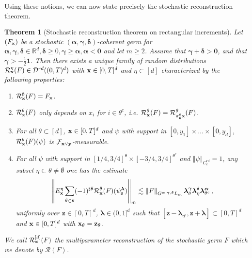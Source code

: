 \documentclass[12pt]{article}
\numberwithin{equation}{section}
\theoremstyle{plain}
\newtheorem{theorem}{Theorem}[section]
\theoremstyle{definition}
\newcommand{\norm}[1]{\left\Vert #1\right\Vert}
\def\bR{\mathbb{R}}\def\bS{\mathbb{S}}
\def\fy{\mathbf y}\def\fz{\mathbf z}
\def\falpha{{\boldsymbol\alpha}}
\def\fgamma{{\boldsymbol\gamma}}
\def\fdelta{{\boldsymbol\delta}}
\def\flambda{{\boldsymbol\lambda}}
\def\foo{{\boldsymbol 0}}
\def\fone{{\boldsymbol 1}}
\begin{document}
 Using these notions, we can now state precisely the stochastic reconstruction theorem.

\begin{theorem}[Stochastic reconstruction theorem on rectangular increments]\label{theo:reconstruction}
Let $(F_\mathbf x)$ be a stochastic $(\falpha,\fgamma,\fdelta)$-coherent germ for $\falpha,\fgamma,\fdelta\in\bR^d, \fdelta\ge 0, \fgamma\ge\falpha,\falpha<\foo$ and let $m\ge 2$. Assume that $\fgamma+\fdelta>\foo$, and that $\fgamma > -\frac{1}{2}\fone$. Then there exists a unique family of random distributions $\mathcal{R}_\mathbf x^\eta(F)\in \mathcal{D}^{rd}((0,T)^d)$  with $\mathbf x\in [0,T]^d$ and $\eta\subset[d]$ characterized by the following properties:

\begin{enumerate}
    \item $\mathcal{R}^\emptyset_\mathbf x (F)= F_\mathbf x$.
    \item $\mathcal{R}^\theta_\mathbf x(F)$ only depends on $x_i$ for $i\in\theta^c$, i.e. $\mathcal{R}^{\theta}_\fx(F) = \mathcal{R}^{\theta}_{\pi_\foo^{\theta} \fx}(F)$.
    \item For all $\theta\subset[d]$, $\mathbf x\in[0,T]^d$ and $\psi$ with support in $[0,y_1]\times\dots\times[0,y_d]$, $\mathcal{R}^\theta_\mathbf x(F)(\psi)$ is $\mathcal F_{\fx\vee\fy}$-measurable.
    \item For all $\psi$ with support in $[1/4,3/4]^{\theta}\times[-3/4,3/4]^{\theta^c}$ and $\norm{\psi}_{C_c^{rd}} = 1$, any subset $\eta\subset\theta\neq\emptyset$ one has the estimate
\begin{equation}\label{cond4Recon}
\norm{E^\eta_\fx\sum_{\hat\theta\subset\theta}(-1)^{\sharp{\hat\theta}} \mathcal{R}^{\hat\theta}_\fx(F)(\psi^{\flambda}_\fz)}_m \lesssim \norm{F}_{G^{\falpha,\fgamma,\fdelta}L_m}\flambda^{\fgamma}_{\theta}\flambda^\fdelta_\eta\flambda^{\falpha}_{\theta^c}\,,
    \end{equation}
  uniformly over $\fz\in [0,T]^d$,  $\flambda\in(0,1]^d$ such that $[\fz-\flambda_{\eta^c},\fz+\flambda]\subset[0,T]^d$ and $\mathbf x\in[0,T]^d$ with $\fx_\theta = \fz_\theta$.
\end{enumerate}
We call $\mathcal{R}^{[d]}_{\mathbf x}(F)$ the multiparameter  reconstruction of the stochastic germ $F$ which we denote by $\mathcal{R} (F)$.
\end{theorem}
\end{document}
